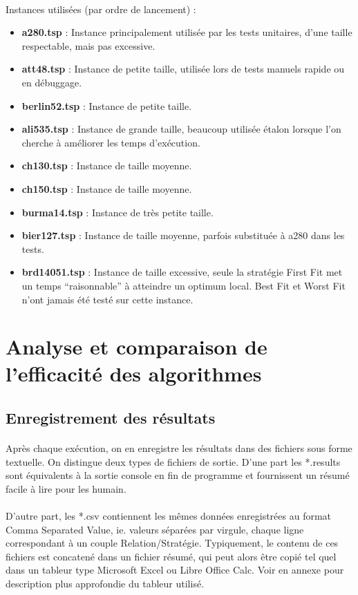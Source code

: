 \documentclass[a4paper,10pt]{report}
\begin{document}
\paragraph{}
Instances utilisées (par ordre de lancement) :
\begin{itemize}
  \item \textbf{a280.tsp} : Instance principalement utilisée par les tests unitaires, d'une taille respectable, mais pas excessive.
  \item \textbf{att48.tsp} : Instance de petite taille, utilisée lors de tests manuels rapide ou en débuggage.
  \item \textbf{berlin52.tsp} : Instance de petite taille.
  \item \textbf{ali535.tsp} : Instance de grande taille, beaucoup utilisée étalon lorsque l'on cherche à améliorer les temps
d'exécution.
  \item \textbf{ch130.tsp} : Instance de taille moyenne.
  \item \textbf{ch150.tsp} : Instance de taille moyenne.
  \item \textbf{burma14.tsp} : Instance de très petite taille.
  \item \textbf{bier127.tsp} : Instance de taille moyenne, parfois substituée à a280 dans les tests.
  \item \textbf{brd14051.tsp} : Instance de taille excessive, seule la stratégie First Fit met un temps ``raisonnable''
à atteindre un optimum local. Best Fit et Worst Fit n'ont jamais été testé sur cette instance.
\end{itemize}

\pagebreak
\section{Analyse et comparaison de l'efficacité des algorithmes}
\subsection{Enregistrement des résultats}

\paragraph{}
  Après chaque exécution, on en enregistre les résultats dans des fichiers sous forme textuelle. On distingue deux
types de fichiers de sortie. D'une part les *.results sont équivalents à la sortie console en fin de programme et
fournissent un résumé facile à lire pour les humain.
\paragraph{}
  D'autre part, les *.csv contiennent les mêmes données enregistrées au format Comma Separated Value, ie. valeurs
séparées par virgule, chaque ligne correspondant à un couple Relation/Stratégie. Typiquement, le contenu de ces 
fichiers est concatené dans un fichier résumé, qui peut alors être copié tel quel dans un tableur type Microsoft
Excel ou Libre Office Calc. Voir en annexe pour description plus approfondie du tableur utilisé.
\end{document}
